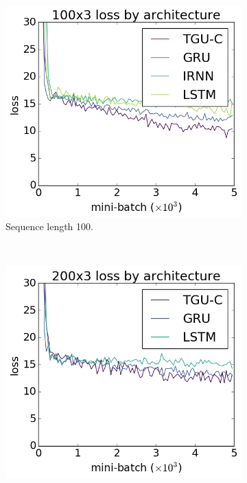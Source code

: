\begin{figure}[htb]
\centering
\begin{subfigure}[t]{0.3\linewidth}
	\includegraphics[width=\linewidth]{exps/vbind/plots/100x3}
	\caption{Sequence length 100.}
\end{subfigure}~
\begin{subfigure}[t]{0.3\linewidth}
	\includegraphics[width=\linewidth]{exps/vbind/plots/200x3}

\end{subfigure}
\end{figure}
